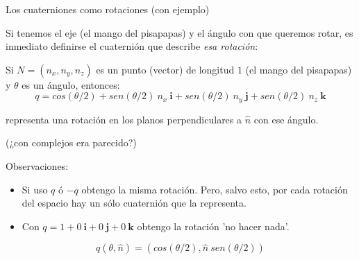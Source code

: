 \documentclass[10pt]{beamer}
\def\R{\mathbb{R}}
\begin{document}
\begin{frame}{Los cuaterniones como rotaciones (con ejemplo)}


Si tenemos el eje (el mango del pisapapas) y el ángulo con que queremos rotar, es inmediato definirse el cuaternión que describe \textit{esa rotación}: \pause

Si $N= (n_x,n_y,n_z)$ es un punto (vector) de longitud $1$ (el mango del pisapapas) y $\theta$ es un ángulo, entonces: \pause
$$q = cos(\theta/2) + sen(\theta/2)\ n_x\ \textbf{i} + sen(\theta/2)\ n_y\ \textbf{j} + sen(\theta/2)\ n_z\ \textbf{k}$$

representa una rotación en los planos perpendiculares a $\hat{n}$ con ese ángulo. \pause

(¿con complejos era parecido?)



\pause Observaciones: 

\begin{itemize}
	\item Si uso $q$ ó $-q$ obtengo la misma rotación. Pero, salvo esto, por cada rotación del espacio hay un sólo cuaternión que la representa.
	\item Con $q=1 + 0\ \textbf{i} + 0\ \textbf{j} + 0\ \textbf{k}$ obtengo la rotación 'no hacer nada'. %
\end{itemize}


$$q(\theta, \hat{n}) = (cos(\theta/2), \hat{n}\ sen(\theta/2))$$




\end{frame}
\end{document}
